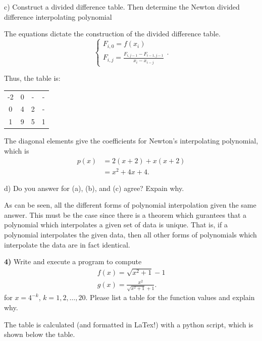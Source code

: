 \documentclass[12pt,a4paper]{article}
\newcommand{\prob}[2]{\textbf{#1)} #2}
\begin{document}
c) Construct a divided difference table.
Then determine the Newton divided difference interpolating polynomial

The equations dictate the construction of the divided difference table.
\[
\begin{cases}
    F_{i,0} = f\left( x_{i} \right) \\
    F_{i,j} = \frac{F_{i,j-1} - F_{i-1,j-1}}{x_{i} - x_{i-j}}
\end{cases}
.\]

Thus, the table is:

\begin{table}[H]
   \begin{center}
       \begin{tabular}{c||c|c|c}
           -2 & 0 & - & - \\
           0 & 4 & 2 & - \\
           1 & 9 & 5 & 1
       \end{tabular}
   \end{center} 
\end{table}

The diagonal elements give the coefficients for Newton's interpolating polynomial, which is
\begin{align*}
    p\left( x \right) &= 2\left( x+2 \right) + x\left( x+2 \right) \\
    &= x^2 + 4x + 4 
.\end{align*}

d) Do you answer for (a), (b), and (c) agree? Expain why.

As can be seen, all the different forms of polynomial interpolation given the same answer.
This must be the case since there is a theorem which gurantees that a polynomial which interpolates a given set of data is unique.
That is, if a polynomial interpolates the given data, then all other forms of polynomials which interpolate the data are in fact identical.

\prob{4}{Write and execute a program to compute
    \begin{align*}
     f\left( x \right) = \sqrt{x^2 + 1} - 1 \\
     g\left( x \right) = \frac{x^2}{\sqrt{x^2 + 1} + 1} 
    .\end{align*}
for $x=4^{-k}$, $k=1,2,\ldots,20$. Please list a table for the function values and explain why.}

The table is calculated (and formatted in LaTex!) with a python script, which is shown below the table.
\end{document}

